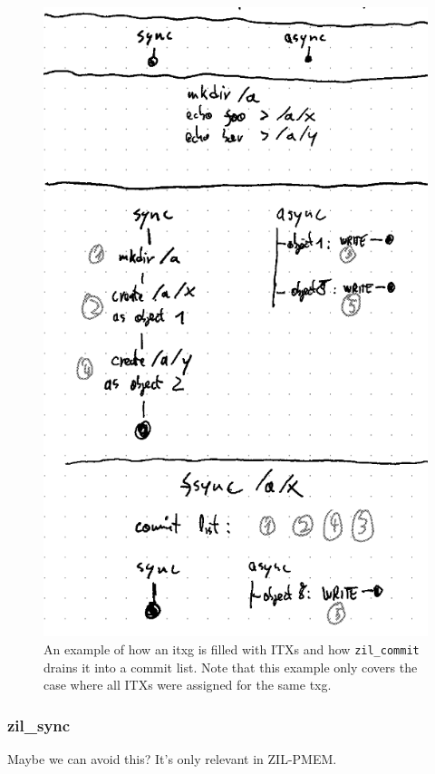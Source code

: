 \documentclass[12pt,a4paper,twoside]{book}
\begin{document}
\begin{figure}[H]
    \includegraphics[height=0.5\textheight]{fig/zil_single_itxg_example}
    \caption{
        An example of how an itxg is filled with ITXs and how \lstinline{zil_commit} drains it into a commit list.
        Note that this example only covers the case where all ITXs were assigned for the same txg.
    }
    \label{fig:zil_per_itxg_state_example}
\end{figure}

\subsubsection{zil\_sync}\label{zilsync}
Maybe we can avoid this? It's only relevant in ZIL-PMEM.
\end{document}
